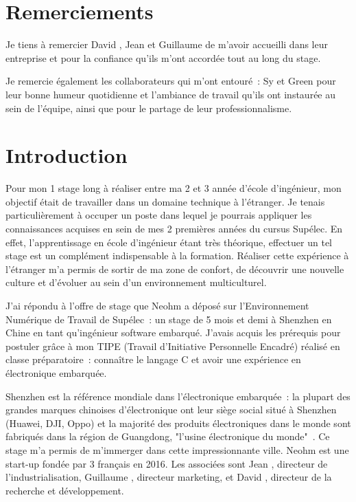 \documentclass[a4paper, 12pt, sffamily]{report}
\begin{document}
\renewcommand{\contentsname}{Sommaire} %

\tableofcontents

\chapter*{Remerciements}

Je tiens à remercier David , Jean  et Guillaume  de m’avoir accueilli dans leur entreprise et pour la confiance qu'ils m'ont accordée tout au long du stage.

Je remercie également les collaborateurs qui m’ont entouré~: Sy et Green pour leur bonne humeur quotidienne et l'ambiance de travail qu’ils ont instaurée au sein de l'équipe, ainsi que pour le partage de leur professionnalisme.

\chapter{Introduction}
Pour mon 1\ier{} stage long à réaliser entre ma 2\ieme{} et 3\ieme{} année d’école d’ingénieur, mon objectif était de travailler dans un domaine technique à l’étranger. Je tenais particulièrement à occuper un poste dans lequel je pourrais appliquer les connaissances acquises en sein de mes 2 premières années du cursus Supélec. En effet, l’apprentissage en école d’ingénieur étant très théorique, effectuer un tel stage est un complément indispensable à la formation. Réaliser cette expérience à l'étranger m'a permis de sortir de ma zone de confort, de découvrir une nouvelle culture et d’évoluer au sein d’un environnement multiculturel.

J’ai répondu à l’offre de stage que Neohm a déposé sur l’Environnement Numérique de Travail de Supélec~: un stage de 5 mois et demi à Shenzhen en Chine en tant qu’ingénieur software embarqué. J’avais acquis les prérequis pour postuler grâce à mon TIPE (Travail d'Initiative Personnelle Encadré) réalisé en classe préparatoire~: connaître le langage C et avoir une expérience en électronique embarquée.

Shenzhen est la référence mondiale dans l’électronique embarquée~: la plupart des grandes marques chinoises d’électronique ont leur siège social situé à Shenzhen (Huawei, DJI, Oppo) et la majorité des produits électroniques dans le monde sont fabriqués dans la région de Guangdong, "l'usine électronique du monde"~\cite{article_shenzhen}. Ce stage m’a permis de m'immerger dans cette impressionnante ville. Neohm est une start-up fondée par 3 français en 2016. Les associées sont Jean , directeur de l’industrialisation, Guillaume , directeur marketing, et David , directeur de la recherche et développement.
\end{document}
